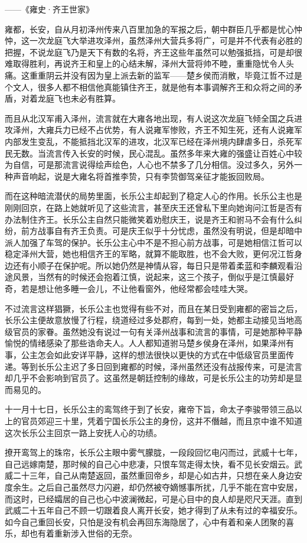 ——《雍史·齐王世家》

雍都，长安，自从月初泽州传来八百里加急的军报之后，朝中群臣几乎都是忧心忡忡，这一次龙庭飞大举进攻泽州，虽然泽州大营兵多将广，可是并不代表有必胜的把握，不说龙庭飞乃是天下有数的名将，齐王这些年虽然可以勉强抵挡，可是却很难取得胜利，再说齐王和皇上的心结未解，泽州大营将帅不睦，重重隐忧令人头痛。这重重阴云并没有因为皇上派去新的监军——楚乡侯而消散，毕竟江哲不过是个文人，很多人都不相信他真能镇住齐王，就是他有本事调解齐王和众将之间的矛盾，对着龙庭飞也未必有胜算。

而且从北汉军甫入泽州，流言就在大雍各地出现，有人说这次龙庭飞倾全国之兵进攻泽州，大雍兵力已经不占优势，有人说雍军惨败，齐王不知生死，还有人说雍军内部发生变乱，不能抵挡北汉军的进攻，北汉军已经在泽州境内肆虐多日，杀死军民无数。当流言传入长安的时候，民心混乱。虽然多年来大雍的强盛让百姓心中较为自信，可是那流言说得绘声绘色，人心也不禁多了几分相信。没过多久，另外一种声音响起，说是大雍名将首推李贽，只有李贽御驾亲征才能扳回败局。

而在这种暗流潜伏的局势里面，长乐公主却起到了稳定人心的作用。长乐公主也是刚刚回京，在路上她就听见了这些流言，甚至庆王还曾私下里向她询问江哲是否有办法制住齐王。长乐公主自然只能微笑着劝慰庆王，说是齐王和驸马不会有什么纠纷，前方战事自有齐王负责。可是庆王似乎十分忧虑，虽然没有明说，但是却暗中派人加强了车驾的保护。长乐公主心中不是不担心前方战事，可是她相信江哲可以稳定泽州大营，她也相信齐王的军略，就算不能取胜，也不会大败，更何况江哲身边还有小顺子在保护呢。所以她仍然是神情从容，每日只是带着柔蓝和李麟观看沿途风景，当然有的时候还会抱着江慎，说起来，这三个孩子，倒似乎是江慎最好奇，若是想让他多睡一会儿，不让他看窗外，他经常都会哇哇大哭。

不过流言这样猖獗，长乐公主也觉得有些不对，而且在某日受到雍都的密旨之后，长乐公主便故意放慢了行程，绕道经过多处郡府，每到一处，她都主动接见当地高级官员的家眷。虽然她没有说过一句有关泽州战事和流言的事情，可是她那种平静愉悦的情绪感染了那些诰命夫人。人人都知道驸马楚乡侯身在泽州，如果泽州有事，公主怎会如此安详平静，这样的想法很快以更快的方式在中低级官员里面传递。等到长乐公主迟了多日回到雍都的时候，泽州虽然还没有战报传来，可是流言却几乎不会影响到官员了。这虽然是朝廷控制的缘故，可是长乐公主的功劳却是显而易见的。

十一月十七日，长乐公主的鸾驾终于到了长安，雍帝下旨，命太子李骏带领三品以上的官员郊迎三十里，凭着宁国长乐公主的身份，这并不僭越，而且京中谁不知道这次长乐公主回京一路上安抚人心的功绩。

撩开鸾驾上的珠帘，长乐公主眼中雾气朦胧，一段段回忆电闪而过，武威十七年，自己远嫁南楚，那时候的自己心中悲凄，只恨车驾走得太快，看不见长安烟云。武威二十三年，自己从南楚返回，虽然重回帝乡，却是心如古井，只想在亲人身边安度余生。之后自己虽然尽力闪避，却仍然被夺嫡憾事所扰，几乎不能在宫中安居，而这时，已经孀居的自己也心中波澜微起，可是心目中的良人却是咫尺天涯。直到武威二十五年自己不顾一切跟着良人离开长安，她才得到了从未有过的幸福安乐。如今自己重回长安，只怕是没有机会再回东海隐居了，心中有着和亲人团聚的喜乐，却也有着重新涉入世俗的无奈。

